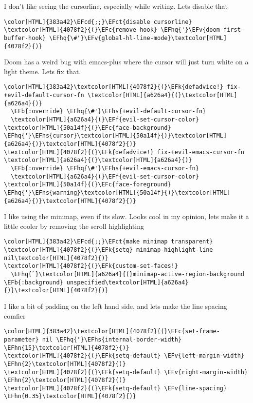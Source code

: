 \documentclass{scrartcl}
\newcommand{\EFk}[1]{\textcolor{EFk}{#1}} %
\newcommand{\EFb}[1]{\textcolor{EFb}{#1}} %
\newcommand{\EFct}[1]{\textcolor{EFct}{#1}} %
\newcommand{\EFc}[1]{\textcolor{EFc}{#1}} %
\newcommand{\EFv}[1]{\textcolor{EFv}{#1}} %
\newcommand{\EFf}[1]{\textcolor{EFf}{#1}} %
\newcommand{\EFcd}[1]{\textcolor{EFcd}{#1}} %
\newcommand{\EFhn}[1]{\textcolor{EFhn}{\textbf{#1}}} %
\newcommand{\EFhq}[1]{\textcolor{EFhq}{#1}} %
\newcommand{\EFhs}[1]{\textcolor{EFhs}{#1}} %
\begin{document}
I don't like seeing the cursorline, especially while writing. Lets disable that
\begin{Code}
\begin{Verbatim}[]
\color[HTML]{383a42}\EFcd{;;}\EFct{disable cursorline}
\textcolor[HTML]{4078f2}{(}\EFc{remove-hook} \EFhq{'}\EFv{doom-first-buffer-hook} \EFhq{\#'}\EFv{global-hl-line-mode}\textcolor[HTML]{4078f2}{)}
\end{Verbatim}
\end{Code}

Doom has a weird bug with emacs-plus where the cursor will just turn white on a light theme. Lets fix that.
\begin{Code}
\begin{Verbatim}[]
\color[HTML]{383a42}\textcolor[HTML]{4078f2}{(}\EFk{defadvice!} fix-+evil-default-cursor-fn \textcolor[HTML]{a626a4}{(}\textcolor[HTML]{a626a4}{)}
  \EFb{:override} \EFhq{\#'}\EFhs{+evil-default-cursor-fn}
  \textcolor[HTML]{a626a4}{(}\EFf{evil-set-cursor-color} \textcolor[HTML]{50a14f}{(}\EFc{face-background} \EFhq{'}\EFhs{cursor}\textcolor[HTML]{50a14f}{)}\textcolor[HTML]{a626a4}{)}\textcolor[HTML]{4078f2}{)}
\textcolor[HTML]{4078f2}{(}\EFk{defadvice!} fix-+evil-emacs-cursor-fn \textcolor[HTML]{a626a4}{(}\textcolor[HTML]{a626a4}{)}
  \EFb{:override} \EFhq{\#'}\EFhs{+evil-emacs-cursor-fn}
  \textcolor[HTML]{a626a4}{(}\EFf{evil-set-cursor-color} \textcolor[HTML]{50a14f}{(}\EFc{face-foreground} \EFhq{'}\EFhs{warning}\textcolor[HTML]{50a14f}{)}\textcolor[HTML]{a626a4}{)}\textcolor[HTML]{4078f2}{)}
\end{Verbatim}
\end{Code}

I like using the minimap, even if its slow. Looks cool in my opinion, lets make it a little cooler by removing the scroll highlighting
\begin{Code}
\begin{Verbatim}[]
\color[HTML]{383a42}\EFcd{;;}\EFct{make minimap transparent}
\textcolor[HTML]{4078f2}{(}\EFk{setq} minimap-highlight-line nil\textcolor[HTML]{4078f2}{)}
\textcolor[HTML]{4078f2}{(}\EFk{custom-set-faces!}
  \EFhq{`}\textcolor[HTML]{a626a4}{(}minimap-active-region-background \EFb{:background} unspecified\textcolor[HTML]{a626a4}{)}\textcolor[HTML]{4078f2}{)}
\end{Verbatim}
\end{Code}

I like a bit of padding on the left hand side, and lets make the line spacing comfier
\begin{Code}
\begin{Verbatim}[]
\color[HTML]{383a42}\textcolor[HTML]{4078f2}{(}\EFc{set-frame-parameter} nil \EFhq{'}\EFhs{internal-border-width} \EFhn{15}\textcolor[HTML]{4078f2}{)}
\textcolor[HTML]{4078f2}{(}\EFk{setq-default} \EFv{left-margin-width} \EFhn{2}\textcolor[HTML]{4078f2}{)}
\textcolor[HTML]{4078f2}{(}\EFk{setq-default} \EFv{right-margin-width} \EFhn{2}\textcolor[HTML]{4078f2}{)}
\textcolor[HTML]{4078f2}{(}\EFk{setq-default} \EFv{line-spacing} \EFhn{0.35}\textcolor[HTML]{4078f2}{)}
\end{Verbatim}
\end{Code}
\end{document}
